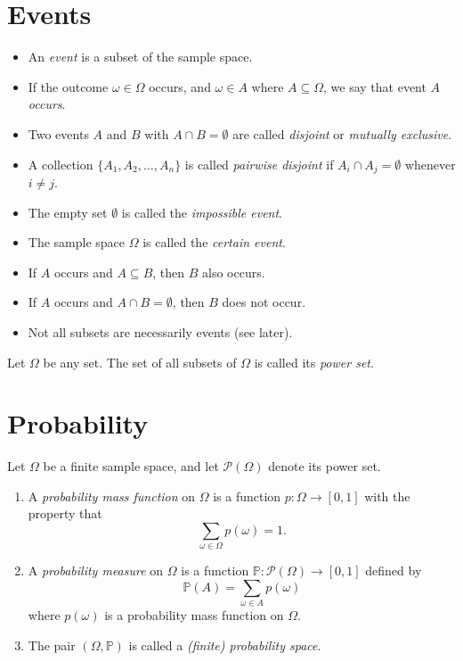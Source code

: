 \documentclass[lecture]{csm}
\newcommand{\prob}{\mathbb{P}}
\def\it{\item}
\def\bit{\begin{itemize}}
\def\eit{\end{itemize}}
\def\ben{\begin{enumerate}}
\def\een{\end{enumerate}}
\begin{document}
\section{Events}

\begin{definition}
\bit
\it An \emph{event} is a subset of the sample space. 
\it If the outcome $\omega\in\Omega$ occurs, and $\omega\in A$ where $A\subseteq\Omega$, we say that event $A$ \emph{occurs}.
\it Two events $A$ and $B$ with $A\cap B=\emptyset$ are called \emph{disjoint} or \emph{mutually exclusive}.
\it A collection $\{A_1,A_2,\ldots,A_n\}$ is called \emph{pairwise disjoint} if $A_i\cap A_j = \emptyset$ whenever $i\neq j$.
\it The empty set $\emptyset$ is called the \emph{impossible event}.
\it The sample space $\Omega$ is called the \emph{certain event}.
\eit
\end{definition}

\begin{remark}
\bit
\it If $A$ occurs and $A\subseteq B$, then $B$ also occurs.
\it If $A$ occurs and $A\cap B=\emptyset$, then $B$ does not occur. 
\it Not all subsets are necessarily events (see later).
\eit
\end{remark}

\begin{definition}
Let $\Omega$ be any set. The set of all subsets of $\Omega$ is called its \emph{power set}.
\end{definition}

\section{Probability}
\begin{definition}
Let $\Omega$ be a finite sample space, and let $\mathcal{P}(\Omega)$ denote its power set.
\ben
\it A \emph{probability mass function} on $\Omega$ is a function $p:\Omega\to[0,1]$ with the property that
\[
\sum_{\omega\in\Omega} p(\omega) = 1.
\]
\it A \emph{probability measure} on $\Omega$ is a function $\prob:\mathcal{P}(\Omega)\to[0,1]$ defined by
\[
\prob(A) = \sum_{\omega\in A} p(\omega)
\]
where $p(\omega)$ is a probability mass function on $\Omega$.
\it The pair $(\Omega,\prob)$ is called a \emph{(finite) probability space}.
\een
\end{definition}
\end{document}
